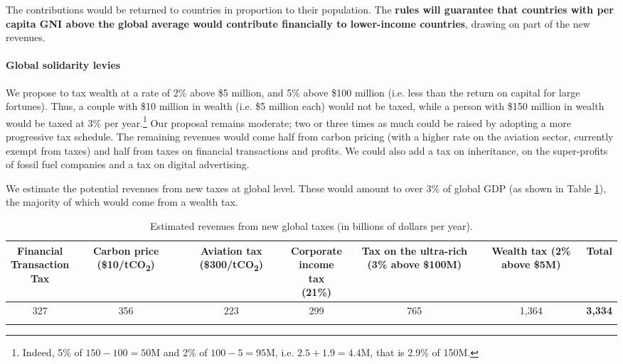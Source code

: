 \documentclass[12pt,english]{article}
\newcommand{\bo}[1]{\textbf{#1}}
\begin{document}
The contributions would be returned to countries in proportion to their population. 
The\textbf{ rules will guarantee that countries with per capita GNI above the global average would contribute financially to lower-income countries}, drawing on part of the new revenues. 

\paragraph{Global solidarity levies}
We propose to tax wealth at a rate of 2\% above \$5 million, and 5\% above \$100 million (i.e. less than the return on capital for large fortunes). Thus, a couple with \$10 million in wealth (i.e. \$5 million each) would not be taxed, while a person with \$150 million in wealth would be taxed at 3\% per year.\footnote{Indeed, 5\% of $150 - 100 = 50$M and 2\% of $100 - 5 = 95$M, i.e. $2.5 + 1.9 = 4.4$M, that is 2.9\% of 150M.} 
Our proposal remains moderate; two or three times as much could be raised by adopting a more progressive tax schedule. The remaining revenues would come half from carbon pricing (with a higher rate on the aviation sector, currently exempt from taxes) and half from taxes on financial transactions and profits. 
We could also add a tax on inheritance, on the super-profits of fossil fuel companies and a tax on digital advertising.\cite{acemoglu_urgent_2024} 

We estimate the potential revenues from new taxes at global level.\cite{fabre_shared_2024} These would amount to over 3\% of global GDP (as shown in Table \ref{tab:su}), the majority of which would come from a wealth tax. %


\begin{table}[h!]
  \centering 
  \caption{Estimated revenues from new global taxes (in billions of dollars per year).\label{tab:su}}
  \begin{tabular}[t]{ccccccc}
  \toprule
  \makecell{Financial\\Transaction\\Tax} & \makecell{Carbon\\price\\(\$10/tCO\textsubscript{2})} & \makecell{Aviation\\tax\\(\$300/tCO\textsubscript{2})} & \makecell{Corporate\\income tax\\(21\%)} & \makecell{Tax on the\\ultra-rich\\(3\% above\\ \$100M)} & \makecell{Wealth tax\\(2\% above\\ \$5M)} & \bo{Total} \\
  \midrule
  327 & 356 & 223 & 299 & 765 & 1,364 & \bo{3,334} \\
  \bottomrule\\[-0.81em]
  \end{tabular}
\end{table}
\end{document}
